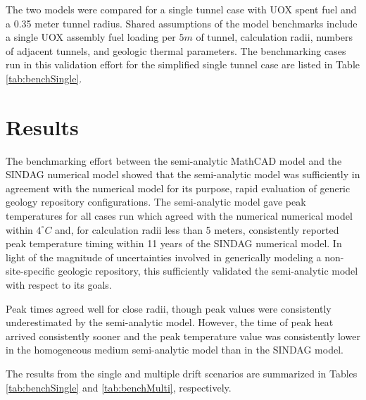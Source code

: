 The two models were compared for a single tunnel case with UOX spent fuel and a 
0.35 meter tunnel radius. Shared assumptions of the model benchmarks include a 
single UOX assembly fuel loading per $5m$ of tunnel, calculation radii, numbers 
of adjacent tunnels, and geologic thermal parameters. The benchmarking cases 
run in this validation effort for the simplified single 
tunnel case are listed in Table \ref{tab:benchSingle}. 


\section{Results}
The benchmarking effort between the semi-analytic MathCAD model and the 
\gls{SINDAG} numerical  model showed that the semi-analytic model was sufficiently 
in agreement with the numerical model for its purpose, rapid evaluation of 
generic geology repository configurations.  The semi-analytic model gave peak 
temperatures for all cases run which agreed with the numerical numerical model 
within $4^{\circ}C$ and, for calculation radii less than 5 meters, consistently 
reported peak temperature timing within 11 years of the \gls{SINDAG} numerical 
model. In light of the magnitude of uncertainties involved in generically 
modeling a non-site-specific geologic repository, this sufficiently validated 
the semi-analytic model with respect to its goals.

Peak times agreed well for close radii, though peak values were consistently 
underestimated by the semi-analytic model. However, the time of peak heat arrived 
consistently sooner and the peak temperature value was consistently lower in the 
homogeneous medium semi-analytic model than in the \gls{SINDAG} model. 

The results from the single and multiple drift scenarios are summarized in 
Tables \ref{tab:benchSingle} and \ref{tab:benchMulti}, respectively. 

